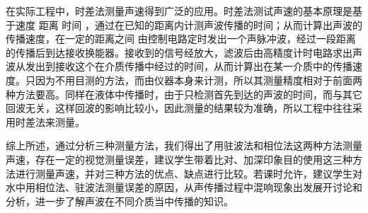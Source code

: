 \documentclass[
  10
]{article}
\begin{document}
在实际工程中，时差法测量声速得到广泛的应用。时差法测试声速的基本原理是基于速度
距离 时间
，通过在已知的距离内计测声波传播的时间；从而计算出声波的传播速度，在一定的距离之间
由控制电路定时发出一个声脉冲波，经过一段距离的传播后到达接收换能器。接收到的信号经放大，滤波后由高精度计时电路求出声波从发出到接收这个在介质传播中经过的时间，从而计算出在某一介质中的传播速度。只因为不用目测的方法，而由仪器本身来计测，所以其测量精度相对于前面两种方法要高。同样在液体中传播时，由于只检测首先到达的声波的时间，而与其它回波无关，这样回波的影响比较小，因此测量的结果较为准确，所以工程中往往采用时差法来测量。

综上所述，通过分析三种测量方法，我们得出了用驻波法和相位法这两种方法测量声速，存在一定的视觉测量误差，建议学生带着比对、加深印象目的使用这三种方法进行测量声速，并对三种方法的优点、缺点进行比较。若课时允许，建议学生对水中用相位法、驻波法测量误差的原因，从声传播过程中混响现象出发展开讨论和分析，进一步了解声波在不同介质当中传播的知识。
\end{document}
